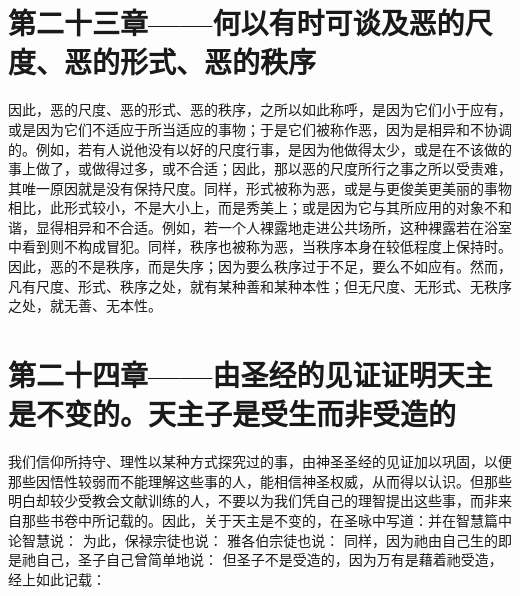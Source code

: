 
\section{第二十三章——何以有时可谈及恶的尺度、恶的形式、恶的秩序}

因此，恶的尺度、恶的形式、恶的秩序，之所以如此称呼，是因为它们小于应有，或是因为它们不适应于所当适应的事物；于是它们被称作恶，因为是相异和不协调的。例如，若有人说他没有以好的尺度行事，是因为他做得太少，或是在不该做的事上做了，或做得过多，或不合适；因此，那以恶的尺度所行之事之所以受责难，其唯一原因就是没有保持尺度。同样，形式被称为恶，或是与更俊美更美丽的事物相比，此形式较小，不是大小上，而是秀美上；或是因为它与其所应用的对象不和谐，显得相异和不合适。例如，若一个人裸露地走进公共场所，这种裸露若在浴室中看到则不构成冒犯。同样，秩序也被称为恶，当秩序本身在较低程度上保持时。因此，恶的不是秩序，而是失序；因为要么秩序过于不足，要么不如应有。然而，凡有尺度、形式、秩序之处，就有某种善和某种本性；但无尺度、无形式、无秩序之处，就无善、无本性。\par


\section{第二十四章——由圣经的见证证明天主是不变的。天主子是受生而非受造的}

我们信仰所持守、理性以某种方式探究过的事，由神圣圣经的见证加以巩固，以便那些因悟性较弱而不能理解这些事的人，能相信神圣权威，从而得以认识。但那些明白却较少受教会文献训练的人，不要以为我们凭自己的理智提出这些事，而非来自那些书卷中所记载的。因此，关于天主是不变的，在圣咏中写道：并在智慧篇中论智慧说： 为此，保禄宗徒也说： 雅各伯宗徒也说： 同样，因为祂由自己生的即是祂自己，圣子自己曾简单地说： 但圣子不是受造的，因为万有是藉着祂受造，经上如此记载：\par

